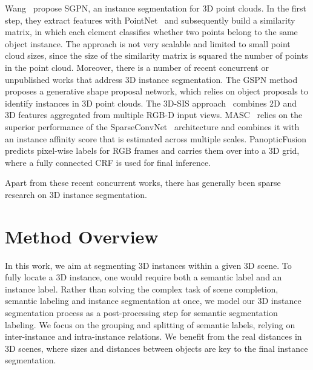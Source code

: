 \documentclass[10pt,twocolumn,letterpaper]{article}
\newcommand{\boldparagraph}[1]{\vspace{0.5em}\noindent{\bf #1} }
\begin{document}
\boldparagraph{3D Instance Segmentation.}
Wang~\etal\cite{Wang-et-al-CVPR-2018} propose SGPN, an instance segmentation for 3D point clouds.
In the first step, they extract features with PointNet~\cite{Qi-et-al-CVPR-2017} and subsequently build a similarity matrix, in which each element classifies whether two points belong to the same object instance.
The approach is not very scalable and limited to small point cloud sizes, since the size of the similarity matrix is squared the number of points in the point cloud.
Moreover, there is a number of recent concurrent or unpublished works that address 3D instance segmentation. The GSPN method~\cite{yi2018gspn} proposes a generative shape proposal network, which relies on object proposals to identify instances in 3D point clouds.
The 3D-SIS approach~\cite{hou20183d} combines 2D and 3D features aggregated from multiple RGB-D input views.
MASC~\cite{liu2019masc} relies on the superior performance of the SparseConvNet~\cite{3DSemanticSegmentationWithSubmanifoldSparseConvNet} architecture and combines it with 
an instance affinity score that is estimated across multiple scales. PanopticFusion \cite{narita2019panopticfusion} predicts pixel-wise labels for RGB frames and carries them over into a 3D grid, where a fully connected CRF is used for final inference. 

Apart from these recent concurrent works, there has generally been sparse research on 3D instance segmentation.









%
 \section{Method Overview} \label{sec:method}


In this work, we aim at segmenting 3D instances within a given 3D scene. 
To fully locate a 3D instance, one would require both a semantic label and an instance label. 
Rather than solving the complex task of scene completion, semantic labeling and instance segmentation at once, we model our 3D instance segmentation process as a post-processing step for semantic segmentation labeling.
We focus on the grouping and splitting of semantic labels, relying on inter-instance and intra-instance relations.
We benefit from the real distances in 3D scenes, where sizes and distances between objects are key to the final instance segmentation. 
\end{document}
